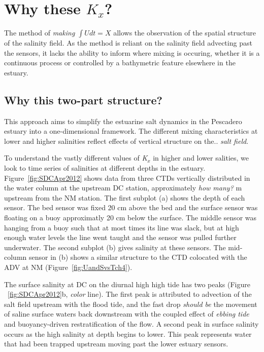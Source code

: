 \section{Why these $K_x$?}

The method of \emph{making $\int{U}dt = X$} allows the observation of the spatial structure of the salinity field.  As the method is reliant on the salinity field advecting past the sensors, it lacks the ability to inform where mixing is occuring, whether it is a continuous process or controlled by a bathymetric feature elsewhere in the estuary. 

\subsection{Why this two-part structure?}

This approach aims to simplify the estuarine salt dynamics in the Pescadero estuary into a one-dimensional framework. The different mixing characteristics at lower and higher salinities reflect effects of vertical structure on the.. \emph{salt field}. 

To understand the vastly different values of \emph{K$_x$} in higher and lower salities, we look to time series of salinities at different depths in the estuary. Figure~\ref{fig:SDCApr2012} shows data from three CTDs vertically distributed in the water column at the upstream DC station, approximately \emph{how many?} m upstream from the NM station. The first subplot (a) shows the depth of each sensor. The bed sensor was fixed 20 cm above the bed and the surface sensor was floating on a buoy approximatly 20 cm below the surface. The middle sensor was hanging from a buoy such that at most times its line was slack, but at high enough water levels the line went taught and the sensor was pulled further underwater. The second subplot (b) gives salinity at these sensors. The mid-column sensor in (b) shows a similar structure to the CTD colocated with the ADV at NM (Figure~\ref{fig:UandSvsTch4}).

The surface salinity at DC on the diurnal high high tide has two peaks (Figure ~\ref{fig:SDCApr2012}b, \emph{color} line). The first peak is attributed to advection of the salt field upstream with the flood tide, and the fast drop \emph{should be} the movement of saline surface waters back downstream with the coupled effect of \emph{ebbing tide} and buoyancy-driven restratification of the flow. A second peak in surface salinity occurs as the high salinity at depth begins to lower. This peak represents water that had been trapped upstream moving past the lower estuary sensors. 


